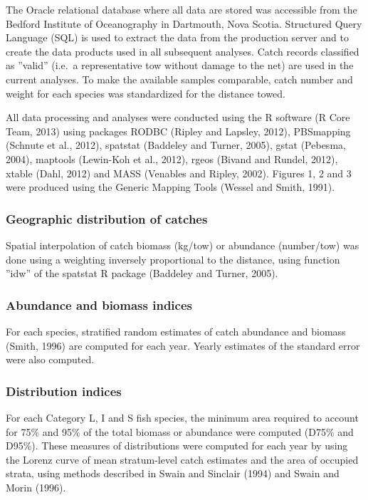 \documentclass[12pt]{article}\usepackage[]{graphicx}\usepackage[]{color}
\begin{document}
The Oracle relational database where all data are stored was accessible from the Bedford Institute of Oceanography in Dartmouth, Nova Scotia. Structured Query Language (SQL) is used to extract the data from the production server and to create the data products used in all subsequent analyses. Catch records classified as ''valid'' (i.e.~a representative tow without damage to the net) are used in the current analyses. To make the available samples comparable, catch number and weight for each species was standardized for the distance towed.

All data processing and analyses were conducted using the R software (R Core Team, 2013) using packages RODBC (Ripley and Lapsley, 2012), PBSmapping (Schnute et al., 2012), spatstat (Baddeley and Turner, 2005), gstat (Pebesma, 2004), maptools (Lewin-Koh et al., 2012), rgeos (Bivand and Rundel, 2012), xtable (Dahl, 2012) and MASS (Venables and Ripley, 2002). Figures 1, 2 and 3 were produced using the Generic Mapping Tools (Wessel and Smith, 1991).

\subsubsection{Geographic distribution of catches}\label{geographic-distribution-of-catches}

Spatial interpolation of catch biomass (kg/tow) or abundance (number/tow) was done using a weighting inversely proportional to the distance, using function ''idw'' of the spatstat R package (Baddeley and Turner, 2005).

\subsubsection{Abundance and biomass indices}\label{abundance-and-biomass-indices}

For each species, stratified random estimates of catch abundance and biomass (Smith, 1996) are computed for each year. Yearly estimates of the standard error were also computed.

\subsubsection{Distribution indices}\label{distribution-indices}

For each Category L, I and S fish species, the minimum area required to account for 75\% and 95\% of the total biomass or abundance were computed (D75\% and D95\%). These measures of distributions were computed for each year by using the Lorenz curve of mean stratum-level catch estimates and the area of occupied strata, using methods described in Swain and Sinclair (1994) and Swain and Morin (1996).
\end{document}
